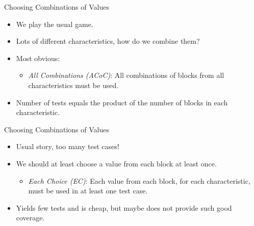 \documentclass{beamer}
\begin{document}
\begin{frame}{Choosing Combinations of Values}
  
  \begin{itemize}
  \item We play the usual game.
  \item Lots of different characteristics, how do we combine them?
  \item Most obvious:
    \begin{itemize}
    \item {\em All Combinations (ACoC)}: All combinations of blocks from all
      characteristics must be used.
    \end{itemize}
  \item Number of tests equals the product of the number of blocks in each
    characteristic. 
  \end{itemize}
  \end{frame}
\begin{frame}{Choosing Combinations of Values}
  \begin{itemize}
  \item Usual story, too many test cases!
  \item We should at least choose a value from each block at least once.
    \begin{itemize}
    \item {\em Each Choice (EC)}: Each value from each block, for each
      characteristic, must be used in at least one test case.
    \end{itemize}
  \item Yields few tests and is cheap, but maybe does not provide such good coverage.
  \end{itemize}
\end{frame}
\end{document}
